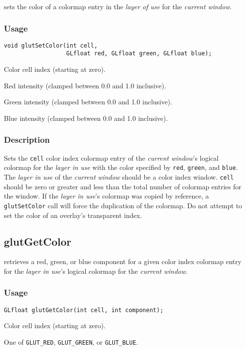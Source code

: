  sets the color of a colormap entry in the {\em layer of use}
for the {\em current window}.

\subsubsection*{Usage}
\begin{verbatim}
void glutSetColor(int cell,
                  GLfloat red, GLfloat green, GLfloat blue);
\end{verbatim}
\begin{description}
\itemsep 0in
\item[{\tt cell}]
Color cell index (starting at zero).
\item[{\tt red}]
Red intensity (clamped between 0.0 and 1.0 inclusive).
\item[{\tt green}]
Green intensity (clamped between 0.0 and 1.0 inclusive).
\item[{\tt blue}]
Blue intensity (clamped between 0.0 and 1.0 inclusive).
\end{description}

\subsubsection*{Description}

Sets the {\tt cell} color index colormap entry of the {\em current window}'s logical
colormap for the {\em layer in use} with the color specified by {\tt red}, {\tt green}, and {\tt blue}.
The {\em layer in use} of the {\em current window} should be a color index window.
{\tt cell} should be zero or greater and less than the total number of colormap entries
for the window.
If the {\em layer in use}'s colormap was copied by reference,
a {\tt glutSetColor} call will force the duplication of the colormap.
Do not attempt to set the color of an overlay's transparent index.

\subsection{glutGetColor}

 retrieves a red, green, or blue component for a given
color index colormap entry for the {\em layer in use}'s logical colormap
for the {\em current window}.

\subsubsection*{Usage}
\begin{verbatim}
GLfloat glutGetColor(int cell, int component);
\end{verbatim}
\begin{description}
\itemsep 0in
\item[{\tt cell}]
Color cell index (starting at zero).
\item[{\tt component}]
One of {\tt GLUT\_RED}, {\tt GLUT\_GREEN}, or {\tt GLUT\_BLUE}.
\end{description}

